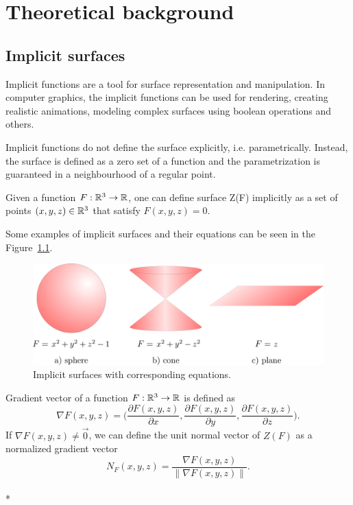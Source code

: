 \chapter{Theoretical background}
\label{chap1} %

\section{Implicit surfaces}
\label{sub2.1}

Implicit functions are a tool for surface representation and manipulation.
In computer graphics, the implicit functions can be used for rendering, 
creating realistic animations, modeling complex surfaces
using boolean operations and others.

Implicit functions do not define the surface explicitly, i.e. parametrically. 
Instead, the surface is defined as a zero set of a function and the parametrization 
is guaranteed in a neighbourhood of a regular point. 
\begin{definition}
    Given a function $F: \mathbb{R}^3 \to \mathbb{R}$, one can define surface Z(F) implicitly
    as a set of points $(x, y, z)\in \mathbb{R}^3$ that satisfy $F(x, y, z) = 0$.
\end{definition}

Some examples of implicit surfaces and their equations can be seen in
the Figure~\ref{img:1}.

\begin{figure}[h!]
    \centerline{\includegraphics[scale=0.5]{images/img1}}
    \caption[Implicit surfaces with corresponding equations]
    {Implicit surfaces with corresponding equations.}
    \label{img:1}
\end{figure}

\begin{definition}
    Gradient vector of a function $F:\mathbb{R}^3 \to \mathbb{R}$ is defined as 
    $$\nabla F(x, y, z) = \bigg(\frac{\partial F(x, y, z)}{\partial x}, \frac{\partial F(x, y, z)}{\partial y}, 
    \frac{\partial F(x, y, z)}{\partial z}\bigg).$$
    If $\nabla F(x,y,z) \neq \vec{0}$, we can define the unit normal vector of $Z(F)$ as 
    a normalized gradient vector
    $$N_F(x, y, z)  = \frac{\nabla F(x, y, z)}{\| \nabla F(x, y, z) \|}.$$
    \\*
\end{definition}

